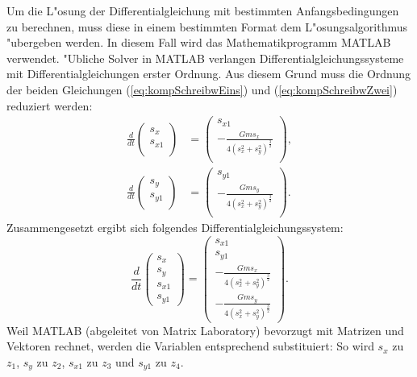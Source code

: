 \begin{refsection}
Um die L"osung der Differentialgleichung mit bestimmten Anfangsbedingungen zu berechnen, muss diese in einem bestimmten Format dem L"osungsalgorithmus "ubergeben werden.
In diesem Fall wird das Mathematikprogramm MATLAB verwendet. 
%
"Ubliche Solver in MATLAB verlangen Differentialgleichungssysteme mit Differentialgleichungen erster Ordnung.
Aus diesem Grund muss die Ordnung der beiden Gleichungen (\ref{eq:kompSchreibwEins}) und (\ref{eq:kompSchreibwZwei}) reduziert werden:
\begin{align*}
\frac{d}{dt} \begin{pmatrix}
s_x \\ 
s_{x1}\\
\end{pmatrix} &= \begin{pmatrix}
s_{x1} \\[1mm]
\displaystyle-\frac{G m s_x}{4(s_x^2 + s_y^2)^\frac32} \\
\end{pmatrix},
\\
\frac{d}{dt} \begin{pmatrix}
s_y \\ 
s_{y1}\\
\end{pmatrix} &= \begin{pmatrix}
s_{y1} \\[1mm]
\displaystyle-\frac{G m s_y}{4(s_x^2 + s_y^2)^\frac32} \\
\end{pmatrix}.
\end{align*}
Zusammengesetzt ergibt sich folgendes Differentialgleichungssystem:
\begin{equation}
\frac{d}{dt} \begin{pmatrix}
s_x \\ 
s_y \\
s_{x1}\\
s_{y1}
\end{pmatrix} =
\begin{pmatrix}
s_{x1} \\ 
s_{y1}\\[1mm]
\displaystyle-\frac{G m s_x}{4(s_x^2 + s_y^2)^\frac32} \\[4mm]
\displaystyle-\frac{G m s_y}{4(s_x^2 + s_y^2)^\frac32}
\end{pmatrix}.
\end{equation}
Weil MATLAB (abgeleitet von Matrix Laboratory) bevorzugt mit Matrizen und Vektoren rechnet, werden die Variablen entsprechend substituiert:
So wird $s_x$ zu $z_1$, $s_y$ zu $z_2$, $s_{x1}$ zu $z_3$ und $s_{y1}$ zu $z_4$.

\end{refsection}
